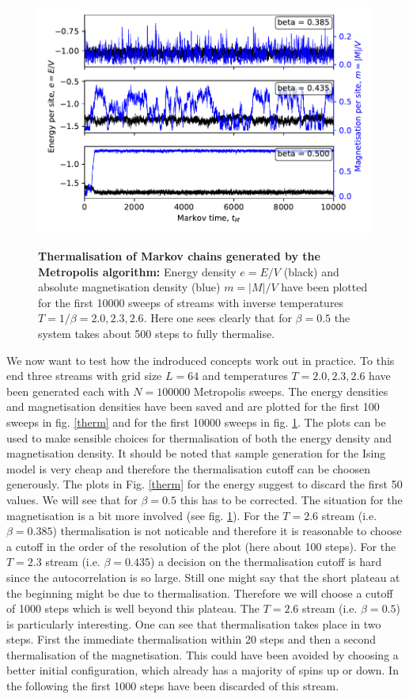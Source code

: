 \documentclass[11pt, a4paper]{scrartcl}
\begin{document}
\begin{figure}
    \includegraphics{chains_10000.pdf}
    \label{10000}
    \caption{\textbf{Thermalisation of Markov chains generated by the Metropolis algorithm:} Energy density $e = E/V$ (black) and absolute magnetisation density (blue) $m = \left| M \right| / V$ have been plotted for the first 10000 sweeps of streams with inverse temperatures $T = 1 / \beta = 2.0, 2.3, 2.6$. Here one sees clearly that for $\beta = 0.5$ the system takes about 500 steps to fully thermalise.}
\end{figure}

We now want to test how the indroduced concepts work out in practice. To this end three streams with grid size $L = 64$ and temperatures $T = 2.0, 2.3, 2.6$ have been generated each with $N = 100000$ Metropolis sweeps. The energy densities and magnetisation densities have been saved and are plotted for the first 100 sweeps in fig. \ref{therm} and for the first 10000 sweeps in fig. \ref{10000}. The plots can be used to make sensible choices for thermalisation of both the energy density and magnetisation density. It should be noted that sample generation for the Ising model is very cheap and therefore the thermalisation cutoff can be choosen generously. The plots in Fig. \ref{therm} for the energy suggest to discard the first 50 values. We will see that for $\beta = 0.5$ this has to be corrected. The situation for the magnetisation is a bit more involved (see fig. \ref{10000}). For the $T=2.6$ stream (i.e. $\beta = 0.385$) thermalisation is not noticable and therefore it is reasonable to choose a cutoff in the order of the resolution of the plot (here about 100 steps). For the $T=2.3$ stream (i.e. $\beta = 0.435$) a decision on the thermalisation cutoff is hard since the autocorrelation is so large. Still one might say that the short plateau at the beginning might be due to thermalisation. Therefore we will choose a cutoff of 1000 steps which is well beyond this plateau. The $T=2.6$ stream (i.e. $\beta = 0.5$) is particularly interesting. One can see that thermalisation takes place in two steps. First the immediate thermalisation within 20 steps and then a second thermalisation of the magnetisation. This could have been avoided by choosing a better initial configuration, which already has a majority of spins up or down. In the following the first 1000 steps have been discarded of this stream.
\end{document}
